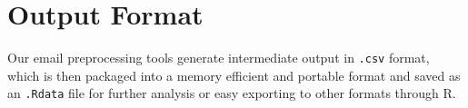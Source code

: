 \documentclass[fleqn]{MJDArticle}
\begin{document}
\section{Output Format}


Our email preprocessing tools generate intermediate output in \texttt{.csv} format, which is then packaged into a memory efficient and portable format and saved as an \texttt{.Rdata} file for further analysis or easy exporting to other formats through R. 

%
%
\end{document}
